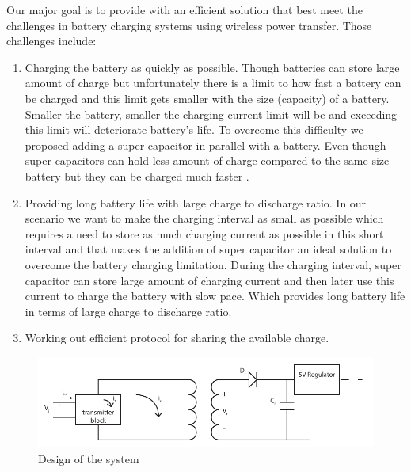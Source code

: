 Our major goal is to provide with an efficient solution that best meet the challenges in battery charging systems using wireless power transfer.
Those challenges include:
\begin{enumerate}
\item Charging the battery as quickly as possible.
Though batteries can store large amount of charge but unfortunately there is a limit to how fast a battery can be charged and this limit gets smaller with the size (capacity) of a battery. Smaller the battery, smaller the charging current limit will be and exceeding this limit will deteriorate battery's life. To overcome this difficulty we proposed adding a super capacitor in parallel with a battery. Even though super capacitors can hold less amount of charge compared to the same size battery but they can be charged much faster \cite{IAmp}.
\item Providing long battery life with large charge to discharge ratio.
In our scenario we want to make the charging interval as small as possible which requires a need to store as much charging current as possible in this short interval and that makes the addition of super capacitor an ideal solution to overcome the battery charging limitation. During the charging interval, super capacitor can store large amount of charging current and then later use this current to charge the battery with slow pace. Which provides long battery life in terms of large charge to discharge ratio.
\item Working out efficient protocol for sharing the available charge.
\end{enumerate}

\begin{figure}[h!]
\centering
\includegraphics[width=1\textwidth]{design.pdf}
\caption{Design of the system}
\label{fig:design1}
\end{figure}

